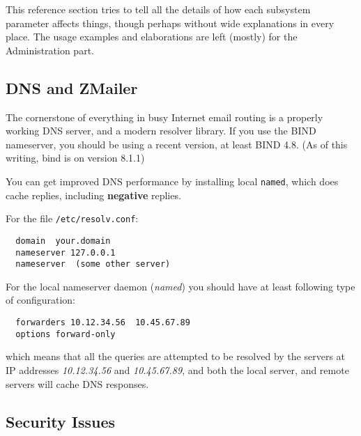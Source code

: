 \startdocument

This reference section tries to tell all the details of how each
subsystem parameter affects things, though perhaps without wide
explanations in every place. The usage examples and elaborations
are left (mostly) for the Administration part.

%
%

\subsection{DNS and ZMailer}

The cornerstone of everything in busy Internet email routing is a properly
working DNS server, and a modern resolver library. If you use the BIND 
nameserver, you should be using a recent version, at least BIND 4.8.
(As of this writing, bind is on version 8.1.1)

You can get improved DNS performance by installing local {\tt named},
which does cache replies, including {\bf negative} replies.

For the file {\tt /etc/resolv.conf}:
\begin{verbatim}
  domain  your.domain
  nameserver 127.0.0.1
  nameserver  (some other server)
\end{verbatim}


For the local nameserver daemon ({\em named\/}) you should have
at least following type of configuration:
\begin{verbatim}
  forwarders 10.12.34.56  10.45.67.89
  options forward-only
\end{verbatim}

which means that all the queries are attempted to be resolved
by the servers at IP addresses {\em 10.12.34.56\/} and
{\em 10.45.67.89\/}, and both the local server, and remote
servers will cache DNS responses.


\subsection{Security Issues}


